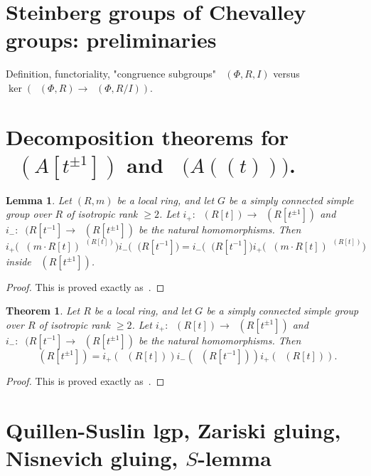 \documentclass[oneside,12pt]{amsart}
\newtheorem{thm}{Theorem}
\numberwithin{equation}{section}
\newtheorem{lem}{Lemma}
\numberwithin{lem}{section}
\theoremstyle{definition}
\theoremstyle{remark}
\DeclareMathOperator{\St}{St^G}
\begin{document}
\section{Steinberg groups of Chevalley groups: preliminaries}

Definition, functoriality, "congruence subgroups"{} $\St(\Phi,R,I)$ versus $\ker(\St(\Phi,R)\to\St(\Phi,R/I))$.


\section{Decomposition theorems for $\St(A[t^{\pm 1}])$ and $\St\bigl(A((t))\bigr)$.}

\begin{lem}
 Let $(R,m)$ be a local ring, and let $G$ be a simply connected simple group over $R$
of isotropic rank $\ge 2$. Let $i_+:\St(R[t])\to\St(R[t^{\pm 1}])$ and $i_-:\St(R[t^{-1}]\to
\St(R[t^{\pm 1}])$ be the natural homomorphisms.
Then
$$
i_+\bigl(\St(m\cdot R[t])^{\St(R[t])}\bigr)i_-\bigl(\St(R[t^{-1}]\bigr)=i_-\bigl(\St(R[t^{-1}]\bigr)
i_+\bigl(\St(m\cdot R[t])^{\St(R[t])}\bigr)
$$
inside $\St(R[t^{\pm 1}])$.
\end{lem}
\begin{proof}
This is proved exactly as~\cite[Lemma 5.12]{St-poly}.
\end{proof}


\begin{thm}\label{thm:3t}
Let $R$ be a local ring, and let $G$ be a simply connected simple group over $R$
of isotropic rank $\ge 2$. Let $i_+:\St(R[t])\to\St(R[t^{\pm 1}])$ and $i_-:\St(R[t^{-1}]\to
\St(R[t^{\pm 1}])$ be the natural homomorphisms.
Then
$$
\St(R[t^{\pm 1}])=i_+(\St(R[t]))i_-(\St(R[t^{-1}]))i_+(\St(R[t])).
$$
\end{thm}
\begin{proof}
This is proved exactly as~\cite[Theorem 5.1]{St-poly}.
\end{proof}


\section{Quillen-Suslin lgp, Zariski gluing, Nisnevich gluing, $S$-lemma}
\end{document}
